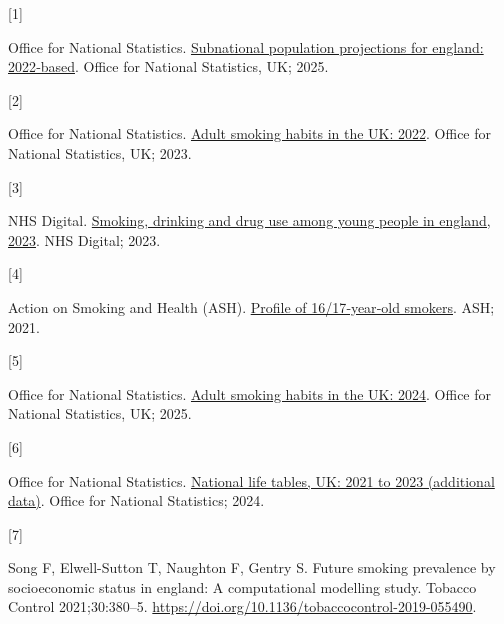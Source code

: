 \documentclass[
  letterpaper,
  DIV=11,
  numbers=noendperiod]{scrartcl}
\newlength{\cslhangindent}
\newlength{\csllabelwidth}
\newenvironment{CSLReferences}[2] %
 {\begin{list}{}{%
  \setlength{\itemindent}{0pt}
  \setlength{\leftmargin}{0pt}
  \setlength{\parsep}{0pt}
  \ifodd #1
   \setlength{\leftmargin}{\cslhangindent}
   \setlength{\itemindent}{-1\cslhangindent}
  \fi
  \setlength{\itemsep}{#2\baselineskip}}}
 {\end{list}}
\newcommand{\CSLLeftMargin}[1]{\parbox[t]{\csllabelwidth}{\strut#1\strut}}
\newcommand{\CSLRightInline}[1]{\parbox[t]{\linewidth - \csllabelwidth}{\strut#1\strut}}
\begin{document}
\label{refs}
\begin{CSLReferences}{0}{0}
\CSLLeftMargin{{[}1{]} }%
\CSLRightInline{Office for National Statistics.
\href{https://www.ons.gov.uk/peoplepopulationandcommunity/populationandmigration/populationprojections/bulletins/subnationalpopulationprojectionsforengland/2022based}{Subnational
population projections for england: 2022‑based}. Office for National
Statistics, UK; 2025.}

\CSLLeftMargin{{[}2{]} }%
\CSLRightInline{Office for National Statistics.
\href{https://www.ons.gov.uk/peoplepopulationandcommunity/healthandsocialcare/healthandlifeexpectancies/bulletins/adultsmokinghabitsingreatbritain/2022}{Adult
smoking habits in the UK: 2022}. Office for National Statistics, UK;
2023.}

\CSLLeftMargin{{[}3{]} }%
\CSLRightInline{NHS Digital.
\href{https://digital.nhs.uk/data-and-information/publications/statistical/smoking-drinking-and-drug-use-among-young-people-in-england/2023}{Smoking,
drinking and drug use among young people in england, 2023}. NHS Digital;
2023.}

\CSLLeftMargin{{[}4{]} }%
\CSLRightInline{Action on Smoking and Health (ASH).
\href{https://ash.org.uk/uploads/Profile-of-16-and-17-year-old-smokers.pdf}{Profile
of 16/17‑year‑old smokers}. ASH; 2021.}

\CSLLeftMargin{{[}5{]} }%
\CSLRightInline{Office for National Statistics.
\href{https://www.ons.gov.uk/peoplepopulationandcommunity/healthandsocialcare/healthandlifeexpectancies/bulletins/adultsmokinghabitsingreatbritain/2024}{Adult
smoking habits in the UK: 2024}. Office for National Statistics, UK;
2025.}

\CSLLeftMargin{{[}6{]} }%
\CSLRightInline{Office for National Statistics.
\href{https://www.ons.gov.uk/peoplepopulationandcommunity/birthsdeathsandmarriages/lifeexpectancies/bulletins/nationallifetablesunitedkingdom/2021to2023additionaldata}{National
life tables, UK: 2021 to 2023 (additional data)}. Office for National
Statistics; 2024.}

\CSLLeftMargin{{[}7{]} }%
\CSLRightInline{Song F, Elwell-Sutton T, Naughton F, Gentry S. Future
smoking prevalence by socioeconomic status in england: A computational
modelling study. Tobacco Control 2021;30:380--5.
\url{https://doi.org/10.1136/tobaccocontrol-2019-055490}.}


\end{CSLReferences}
\end{document}
